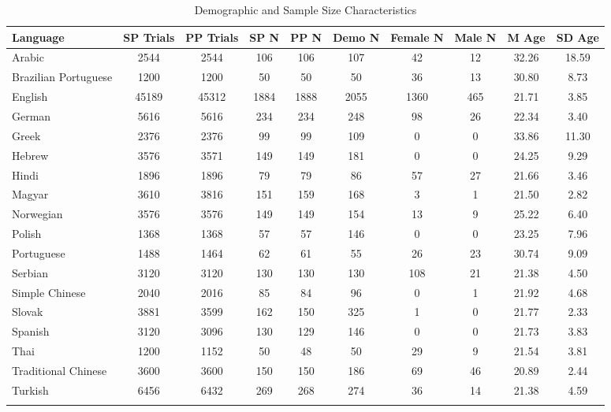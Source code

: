 \documentclass[
  man,floatsintext]{apa7}
\begin{document}
\begin{table}[tbp]

\begin{center}
\begin{threeparttable}

\caption{\label{tab:sample-table}Demographic and Sample Size Characteristics}

\footnotesize{

\begin{tabular}{lccccccccc}
\toprule
Language & SP 
Trials & PP 
Trials & SP 
N & PP 
N & Demo 
N & Female 
N & Male 
N & M 
Age & SD 
Age\\
\midrule
Arabic & 2544 & 2544 & 106 & 106 & 107 & 42 & 12 & 32.26 & 18.59\\
Brazilian Portuguese & 1200 & 1200 & 50 & 50 & 50 & 36 & 13 & 30.80 & 8.73\\
English & 45189 & 45312 & 1884 & 1888 & 2055 & 1360 & 465 & 21.71 & 3.85\\
German & 5616 & 5616 & 234 & 234 & 248 & 98 & 26 & 22.34 & 3.40\\
Greek & 2376 & 2376 & 99 & 99 & 109 & 0 & 0 & 33.86 & 11.30\\
Hebrew & 3576 & 3571 & 149 & 149 & 181 & 0 & 0 & 24.25 & 9.29\\
Hindi & 1896 & 1896 & 79 & 79 & 86 & 57 & 27 & 21.66 & 3.46\\
Magyar & 3610 & 3816 & 151 & 159 & 168 & 3 & 1 & 21.50 & 2.82\\
Norwegian & 3576 & 3576 & 149 & 149 & 154 & 13 & 9 & 25.22 & 6.40\\
Polish & 1368 & 1368 & 57 & 57 & 146 & 0 & 0 & 23.25 & 7.96\\
Portuguese & 1488 & 1464 & 62 & 61 & 55 & 26 & 23 & 30.74 & 9.09\\
Serbian & 3120 & 3120 & 130 & 130 & 130 & 108 & 21 & 21.38 & 4.50\\
Simple Chinese & 2040 & 2016 & 85 & 84 & 96 & 0 & 1 & 21.92 & 4.68\\
Slovak & 3881 & 3599 & 162 & 150 & 325 & 1 & 0 & 21.77 & 2.33\\
Spanish & 3120 & 3096 & 130 & 129 & 146 & 0 & 0 & 21.73 & 3.83\\
Thai & 1200 & 1152 & 50 & 48 & 50 & 29 & 9 & 21.54 & 3.81\\
Traditional Chinese & 3600 & 3600 & 150 & 150 & 186 & 69 & 46 & 20.89 & 2.44\\
Turkish & 6456 & 6432 & 269 & 268 & 274 & 36 & 14 & 21.38 & 4.59\\
\bottomrule
\addlinespace
\end{tabular}

}
\end{threeparttable}
\end{center}
\end{table}
\end{document}
